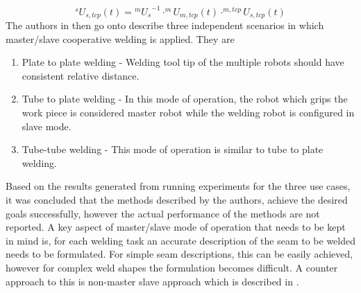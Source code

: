 \begin{equation}
\label{eq14}
^{s}U_{s,tcp}(t) = {^{m}U_{s}}^{-1} \cdot ^{m}U_{m,tcp}(t)\cdot^{m,tcp}U_{s,tcp}(t)
\end{equation}
The authors in \cite{7} then go onto describe three independent scenarios in which master/slave cooperative welding is applied. They are
\begin{enumerate}
\item Plate to plate welding - Welding tool tip of the multiple robots should have consistent relative distance.
\item Tube to plate welding - In this mode of operation, the robot which grips the work piece is considered master robot while the welding robot is configured in slave mode.
\item Tube-tube welding - This mode of operation is similar to tube to plate welding.
\end{enumerate}
Based on the results generated from running experiments for the three use cases, it was concluded that the methods described by the authors, achieve the desired goals successfully, however the actual performance of the methods are not reported. A key aspect of master/slave mode of operation that needs to be kept in mind is, for each welding task an accurate description of the seam to be welded needs to be formulated. For simple seam descriptions, this can be easily achieved, however for complex weld shapes the formulation becomes difficult. A counter approach to this is non-master slave approach which is described in \cite{6}.


